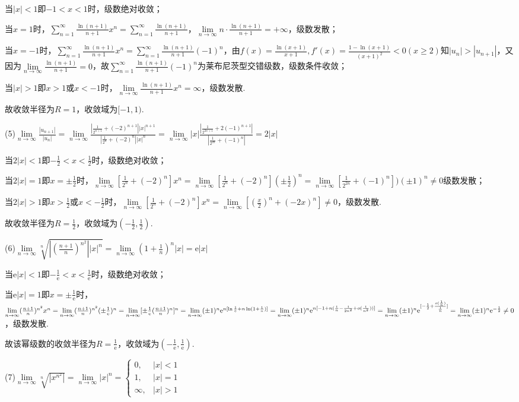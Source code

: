 \documentclass[12pt,UTF8]{ctexart}
\newcommand\Lim[0]{\lim\limits_{n\rightarrow\infty}}
\newcommand\Ser[1]{\sum_{n=#1}^\infty}
\begin{document}
\begin{enumerate}
当$|x|<1$即$-1<x<1$时，级数绝对收敛；

当$x=1$时，$\Ser{1}\frac{\ln(n+1)}{n+1}x^n=\Ser{1}\frac{\ln(n+1)}{n+1}$，$\Lim n\cdot\frac{\ln(n+1)}{n+1}=+\infty$，级数发散；

当$x=-1$时，$\Ser{1}\frac{\ln(n+1)}{n+1}x^n=\Ser{1}\frac{\ln(n+1)}{n+1}(-1)^n$，由$f(x)=\frac{\ln(x+1)}{x+1},f'(x)=\frac{1-\ln(x+1)}{(x+1)^2}<0(x\geq2)$知$|u_n|>|u_{n+1}|$，又因为$\Lim\frac{\ln(n+1)}{n+1}=0$，故$\Ser{1}\frac{\ln(n+1)}{n+1}(-1)^n$为莱布尼茨型交错级数，级数条件收敛；

当$|x|>1$即$x>1$或$x<-1$时，$\Lim\frac{\ln(n+1)}{n+1}x^n=\infty$，级数发散.

故收敛半径为$R=1$，收敛域为$[-1,1)$.

(5)$\Lim\frac{|u_{n+1}|}{|u_n|}=\Lim\frac{|\frac1{2^{n+1}}+(-2)^{n+1}||x|^{n+1}}{|\frac1{2^n}+(-2)^n||x|^n}=\Lim|x|\frac{|\frac1{2^{2n+1}}+2(-1)^{n+1}|}{|\frac1{2^{2n}}+(-1)^n|}=2|x|$

当$2|x|<1$即$-\frac12<x<\frac12$时，级数绝对收敛；

当$2|x|=1$即$x=\pm\frac12$时，$\Lim[\frac1{2^n}+(-2)^n]x^n=\Lim[\frac1{2^n}+(-2)^n](\pm\frac12)^n=\Lim[\frac1{2^{2n}}+(-1)^n])(\pm1)^n\neq0$级数发散；

当$2|x|>1$即$x>\frac12$或$x<-\frac12$时，$\Lim[\frac1{2^n}+(-2)^n]x^n=\Lim[(\frac x{2})^n+(-2x)^n]\neq0$，级数发散.

故收敛半径为$R=\frac12$，收敛域为$(-\frac12,\frac12)$.

(6)$\Lim\sqrt[n]{|(\frac{n+1}n)^{n^2}||x|^n}=\Lim(1+\frac1n)^n|x|=\mathrm e|x|$

当$\mathrm e|x|<1$即$-\frac1{\mathrm e}<x<\frac1{\mathrm e}$时，级数绝对收敛；

当$\mathrm e|x|=1$即$x=\pm\frac1{\mathrm e}$时，$\Lim(\frac{n+1}n)^{n^2}x^n=\Lim(\frac{n+1}n)^{n^2}(\pm\frac1{\mathrm e})^n=\Lim[\pm\frac1{\mathrm e}(\frac{n+1}n)^n]^n\\
=\Lim(\pm1)^n\mathrm e^{n[\ln\frac1{\mathrm e}+n\ln(1+\frac{1}n)]}=\Lim(\pm1)^n\mathrm e^{n[-1+n(\frac1n-\frac1{2n^2}+o(\frac1{n^2}))]}=\Lim(\pm1)^n\mathrm e^{[-\frac12+\frac{o(\frac1{n})}{\frac1n}]}\\
=\Lim(\pm1)^n\mathrm e^{-\frac12}\neq0$，级数发散.

故该幂级数的收敛半径为$R=\frac1{\mathrm e}$，收敛域为$(-\frac1{\mathrm  e},\frac1{\mathrm e})$.

(7)$\Lim\sqrt[n]{|x^{n^2}|}=\Lim|x|^n=\begin{cases}
0,&|x|<1\\
1,&|x|=1\\
\infty,&|x|>1
\end{cases}$


\end{enumerate}
\end{document}
